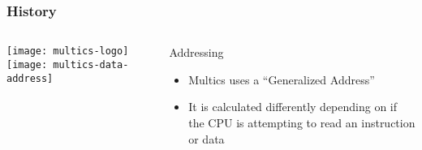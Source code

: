 \begin{frame}[plain]
	\frametitle{History}
	
	
	
	\begin{columns}
		
		\begin{column}{.5\textwidth}
			\texttt{[image: multics-logo]}
			\texttt{[image: multics-data-address]}
			
			
			
		\end{column}
		
		\begin{column}{.5\textwidth}
			
			\Large
			Addressing
			\begin{itemize}
				\item  Multics uses a “Generalized Address”
				\item  It is calculated
				differently depending
				on if the CPU is
				attempting to read an
				instruction or data
				
				
			\end{itemize}	
			
		\end{column}
		
		
	\end{columns}
	
	
\end{frame}



